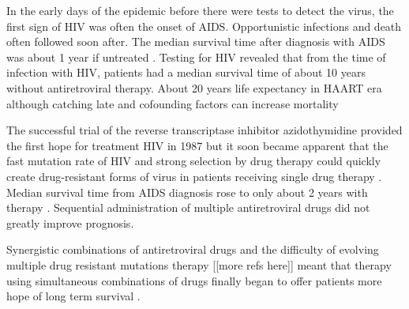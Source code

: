 \documentclass[../sherrill-Mix_thesis.tex]{subfiles}
\begin{document}




	In the early days of the epidemic before there were tests to detect the virus, the first sign of HIV was often the onset of AIDS. Opportunistic infections \citep{Moore1996} and death often followed soon after. The median survival time after diagnosis with AIDS was about 1 year if untreated \citep{Rothenberg1987,Vella1992}. Testing for HIV revealed that from the time of infection with HIV, patients had a median survival time of about 10 years without antiretroviral therapy\citep{Deschamps2000,Harrison2010,CGAIDSIHIVS2000}. %
	About 20 years life expectancy in HAART era \citep{AntiretroviralTherapyCohortCollaboration2009,Harrison2010} although catching late and cofounding factors can increase mortality \citep{AntiretroviralTherapyCohortCollaboration2009}

	The successful trial of the reverse transcriptase inhibitor azidothymidine provided the first hope for treatment HIV in 1987 \citep{Fischl1987,Fischl1989,Volberding1990} but it soon became apparent that the fast mutation rate of HIV \citep{Hahn1986,Preston1988,Roberts1988,Mansky1995,Mansky1996,Abram2010,Achuthan2014} and strong selection by drug therapy could quickly create drug-resistant forms of virus in patients receiving single drug therapy \citep{Larder1989,Larder1989a,Land1990,Boucher1990,Richman1990,Richman1991,Fitzgibbon1992,Richman1994,Schuurman1995,Schmit1996}. Median survival time from AIDS diagnosis rose to only about 2 years with therapy \citep{Creagh-Kirk1988,Fischl1989,Moore1992,Vella1992}. Sequential administration of multiple antiretroviral drugs \citep{Kahn1992,Abrams1994,deJong1994,Schmit1996a} did not greatly improve prognosis.
	 
	Synergistic combinations of antiretroviral drugs \citep{Dornsife1991,Johnson1991,Cox1994,Feng2009,Jilek2012,Kulkarni2014} and the difficulty of evolving multiple drug resistant mutations therapy \citep{Chow1993,Larder1995} [[more refs here]] meant that therapy using simultaneous combinations of drugs finally began to offer patients more hope of long term survival \citep{Collier1993,Eron1995,Collier1996,Hammer1996,Saravolatz1996,Darbyshire1996,Hammer1997,Gulick1997,Moore1999}.
\end{document}
